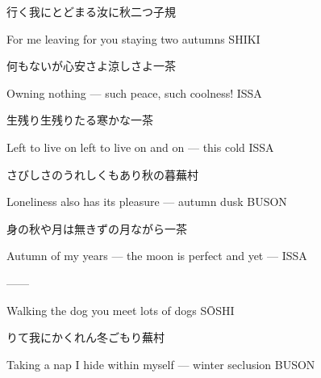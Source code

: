 \begin{haiku}
    {\FH 行く我にとどまる汝に秋二つ}\hfill{\FH 子規}

    \vin{} For me leaving
    \vin{} \vin{} for you staying
    \vin{} \vin{} \vin{} two autumns \hspace{\fill} SHIKI
\end{haiku}

\begin{haiku}
    {\FH 何もないが心安さよ涼しさよ}\hfill{\FH 一茶}

    \vin{} Owning nothing ---
    \vin{} \vin{} such peace,
    \vin{} \vin{} \vin{} such coolness! \hspace{\fill} ISSA
\end{haiku}

\begin{haiku}
    {\FH 生残り生残りたる寒かな}\hfill{\FH 一茶}

    \vin{} Left to live on
    \vin{} \vin{} left to live on and on ---
    \vin{} \vin{} \vin{} this cold \hspace{\fill} ISSA
\end{haiku}

\begin{haiku}
    {\FH さびしさのうれしくもあり秋の暮}\hfill{\FH 蕪村}

    \vin{} Loneliness
    \vin{} \vin{} also has its pleasure ---
    \vin{} \vin{} \vin{} autumn dusk \hspace{\fill} BUSON
\end{haiku}

\begin{haiku}
    {\FH 身の秋や月は無きずの月ながら}\hfill{\FH 一茶}

    \vin{} Autumn of my years ---
    \vin{} \vin{} the moon is perfect
    \vin{} \vin{} \vin{} and yet --- \hspace{\fill} ISSA
\end{haiku}

\begin{haiku}
    ---\hfill{---}

    \vin{} Walking the dog
    \vin{} \vin{} you meet
    \vin{} \vin{} \vin{} lots of dogs \hspace{\fill} S\={O}SHI
\end{haiku}

\begin{haiku}
    {\FH {}りて我にかくれん冬ごもり}\hfill{\FH 蕪村}

    \vin{} Taking a nap
    \vin{} \vin{} I hide within myself ---
    \vin{} \vin{} \vin{} winter seclusion \hspace{\fill} BUSON
\end{haiku}

